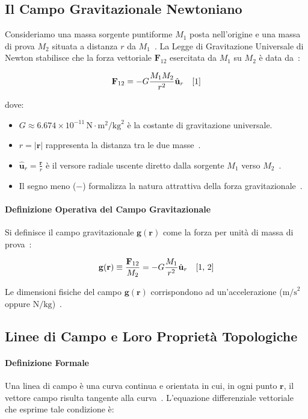 \documentclass[12pt, a4paper]{article}
\begin{document}
\subsection{Il Campo Gravitazionale Newtoniano}

Consideriamo una massa sorgente puntiforme $M_1$ posta nell'origine e una massa di prova $M_2$ situata a distanza $r$ da $M_1$~\cite{1}. La Legge di Gravitazione Universale di Newton stabilisce che la forza vettoriale $\mathbf{F}_{12}$ esercitata da $M_1$ su $M_2$ è data da~\cite{1}:

\[
\mathbf{F}_{12} = - G \frac{M_1 M_2}{r^2} \hat{\mathbf{u}}_r \quad \text{\cite{1}}
\]

dove:
\begin{itemize}
    \item $G \approx 6.674 \times 10^{-11} \, \text{N} \cdot \text{m}^2/\text{kg}^2$ è la costante di gravitazione universale.
    \item $r = |\mathbf{r}|$ rappresenta la distanza tra le due masse~\cite{1}.
    \item $\hat{\mathbf{u}}_r = \frac{\mathbf{r}}{r}$ è il versore radiale uscente diretto dalla sorgente $M_1$ verso $M_2$~\cite{1}.
    \item Il segno meno ($-$) formalizza la natura attrattiva della forza gravitazionale~\cite{1}.
\end{itemize}

\paragraph{Definizione Operativa del Campo Gravitazionale}
Si definisce il campo gravitazionale $\mathbf{g}(\mathbf{r})$ come la forza per unità di massa di prova~\cite{2}:

\[
\mathbf{g}(\mathbf{r}) \equiv \frac{\mathbf{F}_{12}}{M_2} = - G \frac{M_1}{r^2} \hat{\mathbf{u}}_r \quad \text{\cite{1, 2}}
\]

Le dimensioni fisiche del campo $\mathbf{g}(\mathbf{r})$ corrispondono ad un'accelerazione ($\text{m/s}^2$ oppure $\text{N/kg}$)~\cite{2}.

\subsection{Linee di Campo e Loro Proprietà Topologiche}

\paragraph{Definizione Formale}
Una linea di campo è una curva continua e orientata in cui, in ogni punto $\mathbf{r}$, il vettore campo risulta tangente alla curva~\cite{2}. L'equazione differenziale vettoriale che esprime tale condizione è:
\end{document}
